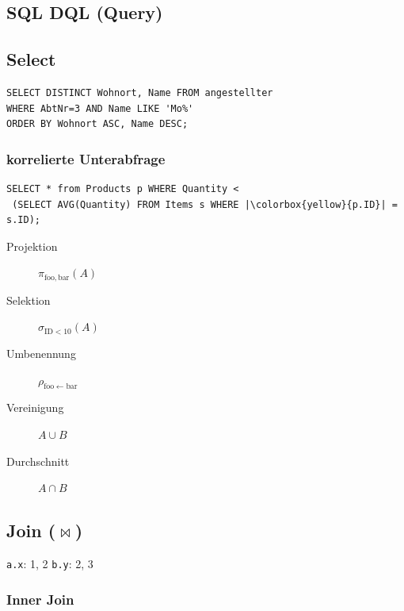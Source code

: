 \begin{multicols*}{3}
\section{SQL DQL (Query)}

\subsection{Select}
\begin{verbatim}
SELECT DISTINCT Wohnort, Name FROM angestellter
WHERE AbtNr=3 AND Name LIKE 'Mo%'
ORDER BY Wohnort ASC, Name DESC;
\end{verbatim}

\subsubsection{korrelierte Unterabfrage}

\begin{verbatim}
SELECT * from Products p WHERE Quantity <
 (SELECT AVG(Quantity) FROM Items s WHERE |\colorbox{yellow}{p.ID}| = s.ID);
\end{verbatim}

\begin{description}
\item[Projektion]{$\pi_{\mathrm{foo, bar}}(A)$ \\
    }
\item[Selektion]{$\sigma_{\mathrm{ID < 10}}(A)$ \\
    }
\item[Umbenennung]{$\rho_{\mathrm{foo} \leftarrow \mathrm{bar}}$ \\
  }
\item[Vereinigung]{$A \cup B$ \\
    }
\item[Durchschnitt]{$A \cap B$ \\
    }
\end{description}

\subsection{Join ($\bowtie$)}

\texttt{a.x}: 1, 2 \hspace{2em} \texttt{b.y}: 2, 3

\subsubsection{Inner Join}


\end{multicols*}
